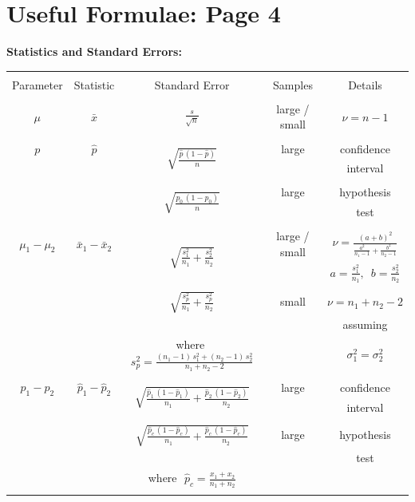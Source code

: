 \documentclass[12pt]{article}
\begin{document}
\section*{Useful Formulae: Page 4\\[0.3cm]}
{\bf Statistics and Standard Errors:}\\[0.1cm]
\begin{adjustwidth}{-2cm}{0cm}
\begin{tabular}{|c|c|c|c|c|}
\hline
&&&&\\[-0.1cm]
Parameter & Statistic & Standard Error & Samples & Details \\[0.3cm]
\hline
&&&&\\[-0.1cm]
$\mu$ & $\bar x$ & ${\displaystyle\frac{s}{\sqrt{n}}}$  & large / small & $\nu = n - 1$ \\[0.5cm]
\hline
&&&&\\[-0.1cm]
$p$ & $\hat p$ & \multirow{2}{*}{${\displaystyle\sqrt{\frac{\hat p\,(1-\hat p)}{n}}}$} & large & confidence \\[-0.1cm]
&&&&interval\\[0.3cm]
\cline{3-5}
&&&&\\[-0.1cm]
&  & \multirow{2}{*}{${\displaystyle\sqrt{\frac{p_0\,(1-p_0)}{n}}}$} & large & hypothesis \\[-0.1cm]
&&&&test\\[0.3cm]
\hline
&&&&\\[-0.1cm]
$\mu_1-\mu_2$ & $\bar x_1 - \bar x_2$ & \multirow{3}{*}{${\displaystyle\sqrt{\frac{s_1^2}{n_1}+\frac{s_2^2}{n_2}}}$} & large / small & ${\displaystyle \nu = \frac{(a+b)^2}{\frac{a^2}{n_1-1}+\frac{b^2}{n_2-1}}}$ \\[0.8cm]
&&&& ${\displaystyle a=\frac{s_1^2}{n_1}, \,\,\, b=\frac{s_2^2}{n_2}}$ \\[0.5cm]
\cline{3-5}
&&&&\\[-0.1cm]
&  & ${\displaystyle\sqrt{\frac{s_p^2}{n_1}+\frac{s_p^2}{n_2}}}$ & small & $\nu = n_1+n_2-2$ \\[0.5cm]
&&&& assuming \\[-0.2cm]
&& where\,\, ${\displaystyle s_p^2 = \frac{(n_1-1)\,s_1^2+(n_2-1)\,s_2^2}{n_1+n_2-2}}$  && $\sigma_1^2 = \sigma_2^2$ \\[0.5cm]
\hline
&&&&\\[-0.1cm]
$p_1-p_2$ & $\hat p_1 - \hat p_2$ & \multirow{2}{*}{${\displaystyle\sqrt{\frac{\hat p_1 \, (1-\hat p_1)}{n_1}+\frac{\hat p_2 \, (1-\hat p_2)}{n_2}}}$} & large & confidence\\[-0.1cm]
&&&&interval\\[0.5cm]
\cline{3-5}
&&&&\\[-0.1cm]
&  & ${\displaystyle\sqrt{\frac{\hat p_c\,(1-\hat p_c)}{n_1}+\frac{\hat p_c\,(1-\hat p_c)}{n_2}}}$ & large & hypothesis\\[-0.4cm]
&&&&test\\[0.2cm]
&&where\,\, ${\displaystyle \hat p_c = \frac{x_1+x_2}{n_1+n_2}}$&&\\[0.5cm]
\hline
\multicolumn{5}{c}{}\\[0.5cm]
\end{tabular}
\end{adjustwidth}
\end{document}
